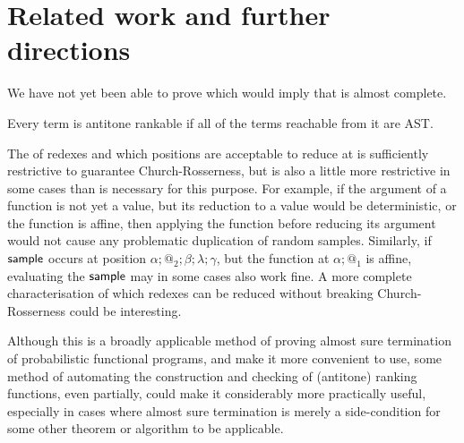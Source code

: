 \section{Related work and further directions}





\label{sec:related}
We have not yet been able to prove  which would imply that  is almost complete.
\begin{conjecture}
\label{conj:antitone}
Every term is antitone rankable if all of the terms reachable from it are AST.
\end{conjecture}

The  of redexes and which positions are acceptable to reduce at is sufficiently restrictive to guarantee Church-Rosserness, but is also a little more restrictive in some cases than is necessary for this purpose. For example, if the argument of a function is not yet a value, but its reduction to a value would be deterministic, or the function is affine, then applying the function before reducing its argument would not cause any problematic duplication of random samples. Similarly, if $\mathsf{sample}$ occurs at position $\alpha;@_2;\beta;\lambda;\gamma$, but the function at $\alpha;@_1$ is affine, evaluating the $\mathsf{sample}$ may in some cases also work fine. A more complete characterisation of which redexes can be reduced without breaking Church-Rosserness could be interesting.

Although this is a broadly applicable method of proving almost sure termination of probabilistic functional programs, and  make it more convenient to use, some method of automating the construction and checking of (antitone) ranking functions, even partially, could make it considerably more practically useful, especially in cases where almost sure termination is merely a side-condition for some other theorem or algorithm to be applicable.
